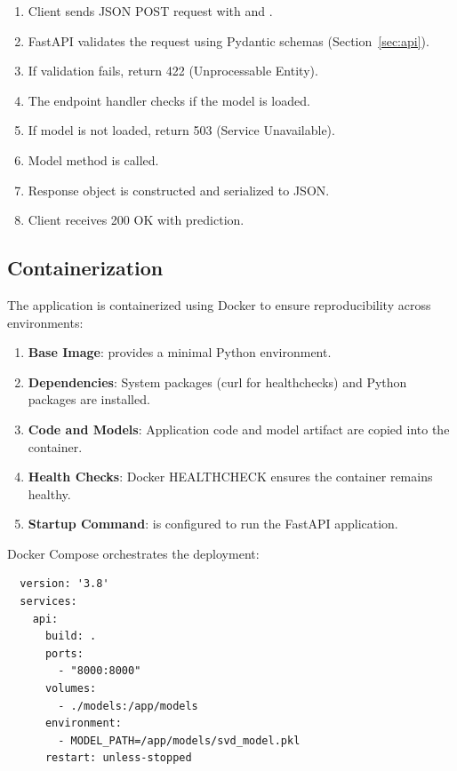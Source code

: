 \begin{enumerate}
  \item Client sends JSON POST request with  and .
  \item FastAPI validates the request using Pydantic schemas (Section~\ref{sec:api}).
  \item If validation fails, return 422 (Unprocessable Entity).
  \item The endpoint handler checks if the model is loaded.
  \item If model is not loaded, return 503 (Service Unavailable).
  \item Model  method is called.
  \item Response object is constructed and serialized to JSON.
  \item Client receives 200 OK with prediction.
\end{enumerate}

\subsection{Containerization}

The application is containerized using Docker to ensure reproducibility across environments:

\begin{enumerate}
  \item \textbf{Base Image}:  provides a minimal Python environment.
  \item \textbf{Dependencies}: System packages (curl for healthchecks) and Python packages are installed.
  \item \textbf{Code and Models}: Application code and model artifact are copied into the container.
  \item \textbf{Health Checks}: Docker HEALTHCHECK ensures the container remains healthy.
  \item \textbf{Startup Command}:  is configured to run the FastAPI application.
\end{enumerate}

Docker Compose orchestrates the deployment:

\begin{verbatim}
  version: '3.8'
  services:
    api:
      build: .
      ports:
        - "8000:8000"
      volumes:
        - ./models:/app/models
      environment:
        - MODEL_PATH=/app/models/svd_model.pkl
      restart: unless-stopped
\end{verbatim}


